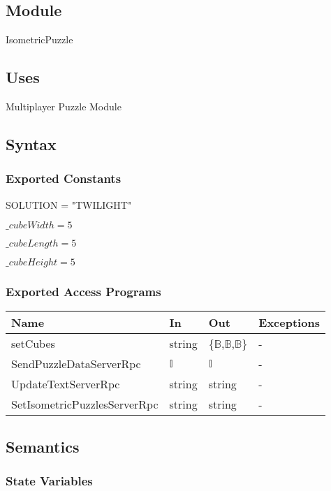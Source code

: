\documentclass[12pt, titlepage]{article}
\begin{document}
\subsection{Module}
IsometricPuzzle

\subsection{Uses}
Multiplayer Puzzle Module

\subsection{Syntax}

\subsubsection{Exported Constants}
SOLUTION = "TWILIGHT"

\noindent $\_cubeWidth=5$

\noindent $\_cubeLength=5$

\noindent $\_cubeHeight=5$

\subsubsection{Exported Access Programs}

\begin{center}
\begin{tabular}{p{5cm} p{4cm} p{4cm} p{2cm}}
\hline
\textbf{Name} & \textbf{In} & \textbf{Out} & \textbf{Exceptions} \\
\hline
setCubes & string & \{$\mathds{B}$,$\mathds{B}$,$\mathds{B}$\} & - \\
SendPuzzleDataServerRpc & $\mathds{I}$ & $\mathds{I}$ & - \\
UpdateTextServerRpc & string & string & - \\
SetIsometricPuzzlesServerRpc & string & string & - \\
\hline
\end{tabular}
\end{center}

\subsection{Semantics}

\subsubsection{State Variables}
\end{document}
